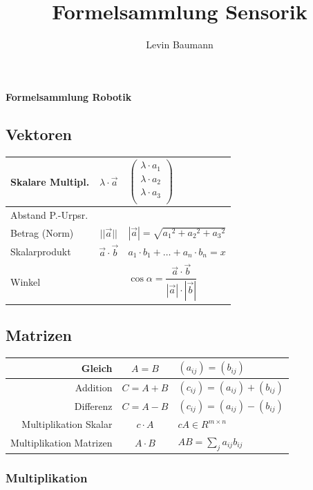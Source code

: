 \documentclass[8pt,a4paper,landscape]{scrartcl}
\author{Levin Baumann}
\title{Formelsammlung Sensorik}
\renewcommand{\arraystretch}{1.25}
\begin{document}
 
\setlength{\columnsep}{1cm} 
\begin{multicols*}{3}
{\LARGE\bfseries Formelsammlung Robotik }

\subsection*{Vektoren}
\renewcommand{\arraystretch}{1}
\begin{tabularx}{\columnwidth}{l|c|X}
	Skalare Multipl. & $ \lambda \cdot \vec{a}$ & 
	$\left(\begin{array}{rrr}                       \lambda \cdot a_1\\
	\lambda \cdot a_2\\
	\lambda \cdot a_3\\                 
	\end{array}\right)$\\ \hline
	Abstand P.-Urpsr. & \\
	Betrag (Norm) & $ ||\vec{a}||$ & 
	$|\vec{a}| = \sqrt{{a_1}^2 + {a_2}^2 + {a_3}^2}$\\ \hline
	Skalarprodukt & $\vec{a}\cdot\vec{b}$ & $a_1 \cdot b_1 + \ldots + a_n \cdot b_n = x$ \\ \hline
	Winkel &  & $\cos \alpha = \dfrac{\vec{a} \cdot \vec{b}}{|\vec{a}| \cdot |\vec{b}|}$ \\ \hline
\end{tabularx}

\subsection*{Matrizen}
\begin{tabularx}{\columnwidth}{r|c|X}
	Gleich & $ A = B $ & $ \left(a_{ij}\right) = \left(b_{ij}\right)$ \\ \hline
	Addition & $ C = A + B $ & $ \left(c_{ij}\right) = \left(a_{ij}\right) + \left(b_{ij}\right) $ \\ \hline
	Differenz & $ C = A - B $ &  $ \left(c_{ij}\right) = \left(a_{ij}\right) - \left(b_{ij}\right) $ \\ \hline
	Multiplikation Skalar & $ c \cdot A $ & $ cA \in R^{m \times n} $ \\ \hline
	Multiplikation Matrizen & $ A \cdot B $ & $ AB = \sum_{j} a_{ij}b_{ij} $
\end{tabularx}

\subsubsection*{Multiplikation}


\end{multicols*}
\end{document}
